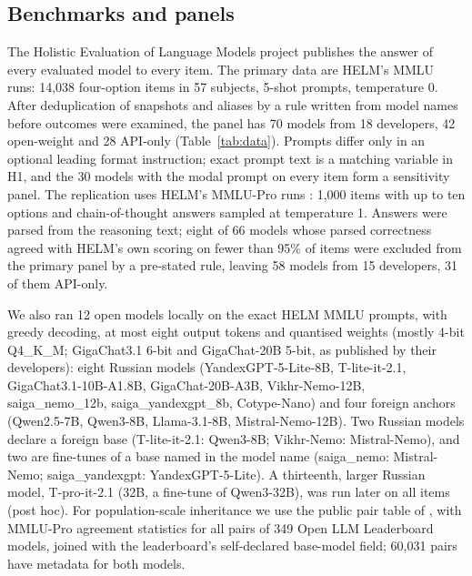 \documentclass[preprint,12pt,authoryear]{elsarticle}
\begin{document}
\subsection{Benchmarks and panels}
The Holistic Evaluation of Language Models project \citep{liang2023helm} publishes the answer of every evaluated model to every item. The primary data are HELM's MMLU \citep{hendrycks2021mmlu} runs: 14,038 four-option items in 57 subjects, 5-shot prompts, temperature 0. After deduplication of snapshots and aliases by a rule written from model names before outcomes were examined, the panel has 70 models from 18 developers, 42 open-weight and 28 API-only (Table~\ref{tab:data}). Prompts differ only in an optional leading format instruction; exact prompt text is a matching variable in H1, and the 30 models with the modal prompt on every item form a sensitivity panel. The replication uses HELM's MMLU-Pro runs \citep{wang2024mmlupro}: 1,000 items with up to ten options and chain-of-thought answers sampled at temperature 1. Answers were parsed from the reasoning text; eight of 66 models whose parsed correctness agreed with HELM's own scoring on fewer than 95\% of items were excluded from the primary panel by a pre-stated rule, leaving 58 models from 15 developers, 31 of them API-only.

We also ran 12 open models locally on the exact HELM MMLU prompts, with greedy decoding, at most eight output tokens and quantised weights (mostly 4-bit Q4\_K\_M; GigaChat3.1 6-bit and GigaChat-20B 5-bit, as published by their developers): eight Russian models (YandexGPT-5-Lite-8B, T-lite-it-2.1, GigaChat3.1-10B-A1.8B, GigaChat-20B-A3B, Vikhr-Nemo-12B, saiga\_\allowbreak nemo\_\allowbreak 12b, saiga\_\allowbreak yandexgpt\_\allowbreak 8b, Cotype-Nano) and four foreign anchors (Qwen2.5-7B, Qwen3-8B, Llama-3.1-8B, Mistral-Nemo-12B). Two Russian models declare a foreign base (T-lite-it-2.1: Qwen3-8B; Vikhr-Nemo: Mistral-Nemo), and two are fine-tunes of a base named in the model name (saiga\_nemo: Mistral-Nemo; saiga\_yandexgpt: YandexGPT-5-Lite). A thirteenth, larger Russian model, T-pro-it-2.1 (32B, a fine-tune of Qwen3-32B), was run later on all items (post hoc). For population-scale inheritance we use the public pair table of \citet{kim2025correlated}, with MMLU-Pro agreement statistics for all pairs of 349 Open LLM Leaderboard models, joined with the leaderboard's self-declared base-model field; 60,031 pairs have metadata for both models.
\end{document}
